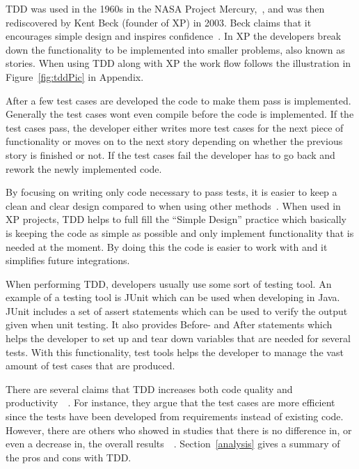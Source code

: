 
TDD was used in the 1960s in the NASA Project Mercury,~\cite{NASA}, and was then rediscovered by Kent Beck (founder of XP) in 2003. Beck claims that it encourages simple design and inspires confidence~\cite{beckXP}. In XP the developers break down the functionality to be implemented into smaller problems, also known as stories. When using TDD along with XP the work flow follows the illustration in Figure~\ref{fig:tddPic} in Appendix. 

After a few test cases are developed the code to make them pass is implemented. Generally the test cases wont even compile before the code is implemented. If the test cases pass, the developer either writes more test cases for the next piece of functionality or moves on to the next story depending on whether the previous story is finished or not. If the test cases fail the developer has to go back and rework the newly implemented code.


By focusing on writing only code necessary to pass tests, it is easier to keep a clean and clear design compared to when using other methods~\cite{beckXP}. When used in XP projects, TDD helps to full fill the ``Simple Design'' practice which basically is keeping the code as simple as possible and only implement functionality that is needed at the moment. By doing this the code is easier to work with and it simplifies future integrations. 

When performing TDD, developers usually use some sort of testing tool. An example of a testing tool is JUnit which can be used when developing in Java. JUnit includes a set of assert statements which can be used to verify the output given when unit testing. It also provides Before- and After statements which helps the developer to set up and tear down variables that are needed for several tests. With this functionality, test tools helps the developer to manage the vast amount of test cases that are produced.

There are several claims that TDD increases both code quality and productivity~\cite{beckXP}~\cite{erdogmus}. For instance, they argue that the test cases are more efficient since the tests have been developed from requirements instead of existing code. However, there are others who showed in studies that there is no difference in, or even a decrease in, the overall results~\cite{tddInvest}~\cite{mullerandhagner}. Section~\ref{analysis} gives a summary of the pros and cons with TDD.
